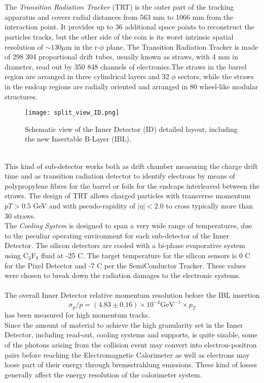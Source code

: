 \\\\
\phantom{1}\hspace{0.3cm}The \emph{Transition Radiation Tracker} (TRT)\cite{collaboration_2008_TRT_barrel, collaboration_2008_TRT_endcaps} is the outer part of the tracking apparatus and covers radial distances from 563 mm to 1066 mm from the interaction point. It provides up to 36 additional space points to reconstruct the particles tracks, but the other side of the coin is its worst intrinsic spatial resolution of $\sim 130 \mu$m in the r-$\phi$ plane. The Transition Radiation Tracker is made of 298 304 proportional drift tubes, usually known as straws, with 4 mm in diameter, read out by 350 848 channels of electronics.The straws in the barrel region are arranged in three cylindrical layers and 32 $\phi$ sectors, while the straws in the endcap regions are radially oriented and arranged in 80 wheel-like modular structures.
\begin{figure}[h]
\centering
\texttt{[image: split\_view\_ID.png]}
\caption{Schematic view of the Inner Detector (ID) detailed layout, including the new Insertable B-Layer (IBL).}
\end{figure}
\\This kind of sub-detector works both as drift chamber measuring the charge drift time and as transition radiation detector to identify electrons by means of polypropylene fibres for the barrel or foils for the endcaps interleaved between the straws. The design of TRT allows charged particles with transverse momentum $pT>0.5$ GeV and with pseudo-rapidity of $|\eta| < 2.0$ to cross typically more than 30 straws.
\\\phantom{1}\hspace{0.3cm}The \emph{Cooling System} is designed to span a very wide range of temperatures, due to the peculiar operating environment for each sub-detector of the Inner Detector. The silicon detectors are cooled with a bi-phase evaporative system using C$_3$F$_8$ fluid at -25 \textdegree{}C. The target temperature for the silicon sensors is 0 \textdegree{}C for the Pixel Detector and -7 \textdegree{}C per the SemiConductor Tracker. These values were chosen to break down the radiation damages to the electronic systems.
\\\\
The overall Inner Detector relative momentum resolution before the IBL insertion 
\begin{equation}
\sigma_p / p = (4.83 \pm 0.16) \times 10^{-4}\text{GeV}^{-1} \times p_T
\end{equation}
has been measured for high momentum tracks.
\\
Since the amount of material to achieve the high granularity set in the Inner Detector, including read-out, cooling systems and supports, is quite sizable, some of the photons arising from the collision event may convert into electron-positron pairs before reaching the Electromagnetic Calorimeter as well as electrons may loose part of their energy through bremsstrahlung emissions. These kind of losses generally affect the energy resolution of the calorimeter system.

